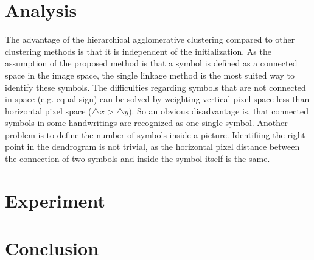 \documentclass[twocolumn, twoside]{article}%
\begin{document}
	\section{Analysis}
		The advantage of the hierarchical agglomerative clustering compared to other clustering methods is that it is independent of the initialization. As the assumption of the proposed method is that a symbol is defined as a connected space in the image space, the single linkage method is the most suited way to identify these symbols. The difficulties regarding symbols that are not connected in space (e.g. equal sign) can be solved by weighting vertical pixel space less than horizontal pixel space ($\triangle x > \triangle y$). 
		So an obvious disadvantage is, that connected symbols in some handwritings are recognized as one single symbol. Another problem is to define the number of symbols inside a picture. Identifiing the right point in the dendrogram is not trivial, as the horizontal pixel distance between the connection of two symbols and inside the symbol itself is the same.
	
	\section{Experiment}
	
	\section{Conclusion}
\end{document}
